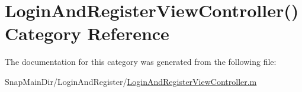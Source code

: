 \hypertarget{category_login_and_register_view_controller_07_08}{}\section{Login\+And\+Register\+View\+Controller() Category Reference}
\label{category_login_and_register_view_controller_07_08}


The documentation for this category was generated from the following file\+:\begin{DoxyCompactItemize}
\item 
Snap\+Main\+Dir/\+Login\+And\+Register/\hyperlink{_login_and_register_view_controller_8m}{Login\+And\+Register\+View\+Controller.\+m}\end{DoxyCompactItemize}
